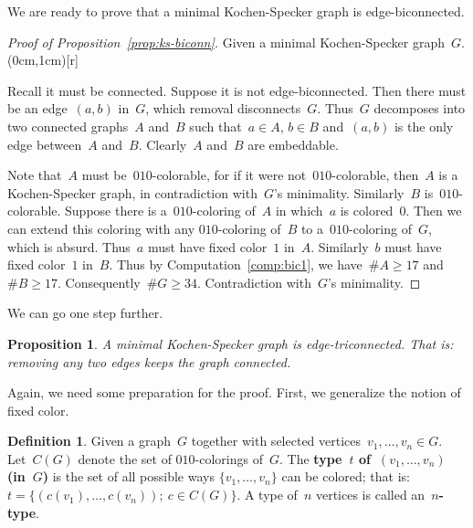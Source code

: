 \documentclass[adraft,copyright,creativecommons]{eptcs}
\newcommand{\keyword}[1]{\textbf{#1}}
\newcounter{main}
\newtheorem{prop}[main]{Proposition}
\theoremstyle{definition}
\newtheorem{dfn}[main]{Definition}
\theoremstyle{remark}
\begin{document}
We are ready to prove that a minimal Kochen-Specker graph
is edge-biconnected.
\begin{proof}[Proof of Proposition~\ref{prop:ks-biconn}]
Given a minimal Kochen-Specker graph~$G$.
\parpic(0cm,1cm)[r]{%
    }
Recall it must be connected.  Suppose it is not edge-biconnected.
Then there must be an edge~$(a,b)$ in~$G$,
which removal disconnects~$G$.
Thus~$G$ decomposes into two connected graphs~$A$ and~$B$
such that~$a\in A$, $b \in B$ and~$(a,b)$ is the only edge
between~$A$ and~$B$.
Clearly~$A$ and~$B$ are embeddable.

Note that~$A$ must be~$010$-colorable,
for if it were not~$010$-colorable,
then~$A$ is a Kochen-Specker graph,
in contradiction with~$G$'s minimality.
Similarly~$B$ is~$010$-colorable.
Suppose there is a~$010$-coloring of~$A$ in which~$a$ is colored~$0$.
Then we can extend this coloring with any $010$-coloring of~$B$
to a~$010$-coloring of~$G$, which is absurd.
Thus~$a$ must have fixed color~$1$ in~$A$.
Similarly~$b$ must have fixed color~$1$ in~$B$.
Thus by Computation~\ref{comp:bic1},
we have~$\#A \geq 17$ and~$\#B \geq 17$.
Consequently~$\#G \geq 34$.
Contradiction with~$G$'s minimality.
\end{proof}

We can go one step further.

\begin{prop}\label{prop:ks-triconn}
    A minimal Kochen-Specker graph is edge-triconnected.
    That is: removing any two edges keeps the graph connected.
\end{prop}

Again, we need some preparation for the proof.  First, we generalize
the notion of fixed color.



\begin{dfn}
   Given a graph~$G$ together with selected vertices~$v_1, \ldots, v_n \in G$.
   Let~$C(G)$ denote the set of $010$-colorings of~$G$.
   The \keyword{type~$t$ of~$(v_1,\ldots,v_n)$ (in~$G$)}
   is the set of all possible ways $\{v_1, \ldots, v_n\}$ can be colored;
   that is: $t = \{ (c(v_1), \ldots, c(v_n));
                \ c \in C(G) \}.$ 
    A type of~$n$ vertices is
    called an~\keyword{$n$-type}.
\end{dfn}
\end{document}
